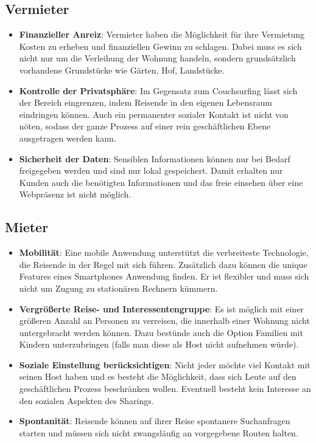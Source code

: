 \subsection{Vermieter}
\begin{itemize}
   \item 
   \textbf{Finanzieller Anreiz}: Vermieter haben die Möglichkeit für ihre Vermietung Kosten zu erheben und finanziellen Gewinn zu schlagen.
   Dabei muss es sich nicht nur um die Verleihung der Wohnung handeln, sondern grundsätzlich vorhandene Grundstücke wie Gärten, Hof, Landstücke.

   \item 
   \textbf{Kontrolle der Privatsphäre}: Im Gegensatz zum Couchsurfing lässt sich der Bereich eingrenzen, indem Reisende in den eigenen Lebensraum eindringen können. Auch ein permanenter sozialer Kontakt ist nicht von nöten, sodass der ganze Prozess auf einer rein geschäftlichen Ebene ausgetragen werden kann.

   \item 
   \textbf{Sicherheit der Daten}: Sensiblen Informationen können nur bei Bedarf freigegeben werden und sind nur lokal gespeichert. Damit erhalten nur Kunden auch die benötigten Informationen und das freie einsehen über eine Webpräsenz ist nicht möglich.

\end{itemize}
   

\subsection{Mieter}
\begin{itemize}
   \item 
   \textbf{Mobilität}: Eine mobile Anwendung unterstützt die verbreiteste Technologie, die Reisende in der Regel mit sich führen. Zusätzlich dazu können die unique Features eines Smartphones Anwendung finden.
   Er ist flexibler und muss sich nicht um Zugung zu stationären Rechnern kümmern.

   \item 
   \textbf{Vergrößerte Reise- und Interessentengruppe}: Es ist möglich mit einer größeren Anzahl an Personen zu verreisen, die innerhalb einer Wohnung nicht untergebracht werden können. Dazu bestünde auch die Option Familien mit Kindern unterzubringen (falls man diese als Host nicht aufnehmen würde). 


   \item
   \textbf{Soziale Einstellung berücksichtigen}: Nicht jeder möchte viel Kontakt mit seinen Host haben und es besteht die Möglichkeit, dass sich Leute auf den geschäftlichen Prozess beschränken wollen. Eventuell besteht kein Interesse an den sozialen Aspekten des Sharings.

   \item 
   \textbf{Spontanität}: Reisende können auf ihrer Reise spontanere Suchanfragen starten und müssen sich nicht zwangsläufig an vorgegebene Routen halten. 

\end{itemize}
     

